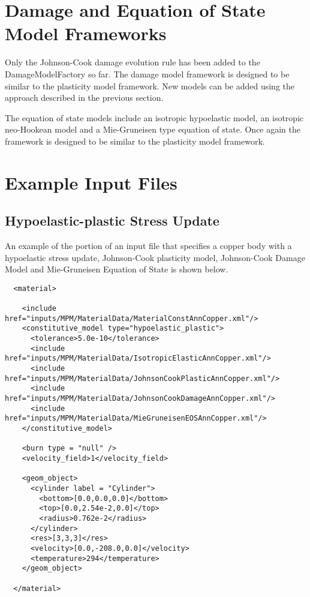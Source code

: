 \documentclass[10pt]{article}
\begin{document}
  \section{Damage and Equation of State Model Frameworks}
  Only the Johnson-Cook damage evolution rule has been added to the 
  DamageModelFactory so far.  The damage model framework is designed 
  to be similar to the plasticity model framework.  New models can
  be added using the approach described in the previous section.

  The equation of state models include an isotropic hypoelastic 
  model, an isotropic neo-Hookean model and a Mie-Gruneisen type
  equation of state.  Once again the framework is designed to be
  similar to the plasticity model framework.
  
  \section{Example Input Files}
  \subsection{Hypoelastic-plastic Stress Update}
  An example of the portion of an input file that specifies a copper body
  with a hypoelastic stress update, Johnson-Cook plasticity model,
  Johnson-Cook Damage Model and Mie-Gruneisen Equation of State is shown 
  below.
  \begin{verbatim}
  <material>

    <include href="inputs/MPM/MaterialData/MaterialConstAnnCopper.xml"/>
    <constitutive_model type="hypoelastic_plastic">
      <tolerance>5.0e-10</tolerance>
      <include href="inputs/MPM/MaterialData/IsotropicElasticAnnCopper.xml"/>
      <include href="inputs/MPM/MaterialData/JohnsonCookPlasticAnnCopper.xml"/>
      <include href="inputs/MPM/MaterialData/JohnsonCookDamageAnnCopper.xml"/>
      <include href="inputs/MPM/MaterialData/MieGruneisenEOSAnnCopper.xml"/>
    </constitutive_model>

    <burn type = "null" />
    <velocity_field>1</velocity_field>

    <geom_object>
      <cylinder label = "Cylinder">
        <bottom>[0.0,0.0,0.0]</bottom>
        <top>[0.0,2.54e-2,0.0]</top>
        <radius>0.762e-2</radius>
      </cylinder>
      <res>[3,3,3]</res>
      <velocity>[0.0,-208.0,0.0]</velocity>
      <temperature>294</temperature>
    </geom_object>

  </material>
  \end{verbatim}
\end{document}
